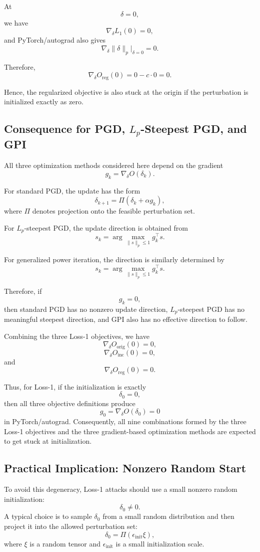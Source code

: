 \documentclass{article}
\begin{document}
At
\[
\delta=0,
\]
we have
\[
\nabla_\delta L_1(0)=0,
\]
and PyTorch/autograd also gives
\[
\nabla_\delta \|\delta\|_p\big|_{\delta=0}=0.
\]

Therefore,
\[
\nabla_\delta O_{\mathrm{reg}}(0)
=
0-c\cdot 0
=
0.
\]

Hence, the regularized objective is also stuck at the origin if the perturbation is initialized exactly as zero.

\subsection{Consequence for PGD, \(L_p\)-Steepest PGD, and GPI}

All three optimization methods considered here depend on the gradient
\[
g_k=\nabla_\delta O(\delta_k).
\]

For standard PGD, the update has the form
\[
\delta_{k+1}
=
\Pi\left(\delta_k+\alpha g_k\right),
\]
where \(\Pi\) denotes projection onto the feasible perturbation set.

For \(L_p\)-steepest PGD, the update direction is obtained from
\[
s_k
=
\arg\max_{\|s\|_p\le 1} g_k^\top s.
\]

For generalized power iteration, the direction is similarly determined by
\[
s_k
=
\arg\max_{\|s\|_p\le 1} g_k^\top s.
\]

Therefore, if
\[
g_k=0,
\]
then standard PGD has no nonzero update direction, \(L_p\)-steepest PGD has no meaningful steepest direction, and GPI also has no effective direction to follow.

Combining the three Loss-1 objectives, we have
\[
\nabla_\delta O_{\mathrm{orig}}(0)=0,
\]
\[
\nabla_\delta O_{\mathrm{inc}}(0)=0,
\]
and
\[
\nabla_\delta O_{\mathrm{reg}}(0)=0.
\]

Thus, for Loss-1, if the initialization is exactly
\[
\delta_0=0,
\]
then all three objective definitions produce
\[
g_0=\nabla_\delta O(\delta_0)=0
\]
in PyTorch/autograd. Consequently, all nine combinations formed by the three Loss-1 objectives and the three gradient-based optimization methods are expected to get stuck at initialization.

\subsection{Practical Implication: Nonzero Random Start}

To avoid this degeneracy, Loss-1 attacks should use a small nonzero random initialization:
\[
\delta_0\neq 0.
\]
A typical choice is to sample \(\delta_0\) from a small random distribution and then project it into the allowed perturbation set:
\[
\delta_0
=
\Pi\left(\epsilon_{\mathrm{init}}\xi\right),
\]
where \(\xi\) is a random tensor and \(\epsilon_{\mathrm{init}}\) is a small initialization scale.
\end{document}
